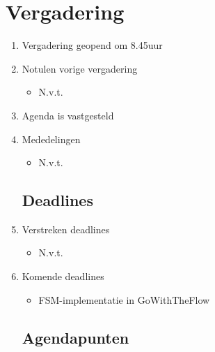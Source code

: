 \documentclass{article}
\begin{document}
\section*{Vergadering}
\begin{enumerate}

	\subsection*{Vooraf}
	\item Vergadering geopend om 8.45uur%
	\item Notulen vorige vergadering
	\begin{itemize}
		\item N.v.t.
	\end{itemize}
	\item Agenda is vastgesteld
	\item Mededelingen
	\begin{itemize}
		\item N.v.t.
	\end{itemize}

	\subsection*{Deadlines}
	\item Verstreken deadlines
	\begin{itemize}
		\item N.v.t.
	\end{itemize}
	\item Komende deadlines
	\begin{itemize}
		\item FSM-implementatie in GoWithTheFlow
	\end{itemize}

	\subsection*{Agendapunten}



\end{enumerate}
\end{document}
